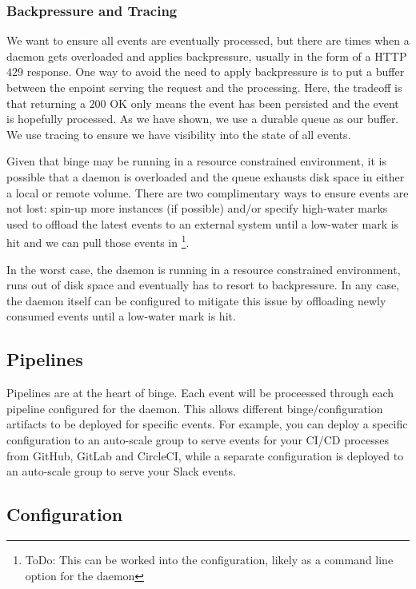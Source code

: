 \documentclass[10pt,twocolumn]{article}
\begin{document}
\subsubsection{Backpressure and Tracing}

We want to ensure all events are eventually processed, but there are times when
a daemon gets overloaded and applies backpressure, usually in the form of a
HTTP $429$ response.  One way to avoid the need to apply backpressure is to put
a buffer between the enpoint serving the request and the processing.  Here, the
tradeoff is that returning a $200$ OK only means the event has been persisted
and the event is hopefully processed.  As we have shown, we use a durable queue
as our buffer.  We use tracing to ensure we have visibility into the state of
all events.  

Given that binge may be running in a resource constrained environment, it is
possible that a daemon is overloaded and the queue exhausts disk space in
either a local or remote volume.  There are two complimentary ways to ensure
events are not lost: spin-up more instances (if possible) and/or specify
high-water marks used to offload the latest events to an external system until
a low-water mark is hit and we can pull those events in \footnote{ToDo: This
can be worked into the configuration, likely as a command line option for the
daemon}.

In the worst case, the daemon is running in a resource constrained environment,
runs out of disk space and eventually has to resort to backpressure.  In any
case, the daemon itself can be configured to mitigate this issue by offloading
newly consumed events until a low-water mark is hit.

\subsection{Pipelines}

Pipelines are at the heart of binge.  Each event will be proceessed through
each pipeline configured for the daemon.  This allows different
binge/configuration artifacts to be deployed for specific events.  For example,
you can deploy a specific configuration to an auto-scale group to serve events
for your CI/CD processes from GitHub, GitLab and CircleCI, while a separate
configuration is deployed to an auto-scale group to serve your Slack
events.

\subsection{Configuration}
\end{document}
